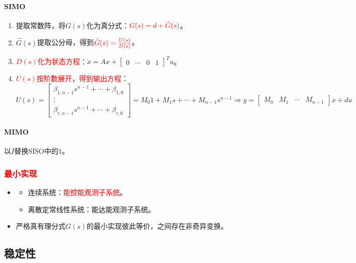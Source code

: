 \documentclass[
12pt, %
a4paper, 
oneside, %
]{scrartcl}
\begin{document}
\paragraph{SIMO}
\begin{enumerate}
\item 提取常数阵，将$ G(s) $化为真分式：$ \textcolor{red}{G(s) = d + \hat{G}(s)} $。
\item $ \hat{G}(s) $提取公分母，得到$ \textcolor{red}{\hat{G}(s) = \frac{U(s)}{D(s)}} $。
\item \textcolor{red}{$ D(s) $化为状态方程}：$ \dot{x} = A x + \begin{bmatrix} 0 & \cdots & 0 & 1 \end{bmatrix}^T u $。
\item \textcolor{red}{$ U(s) $按阶数展开，得到输出方程}：
$$ U(s) = \begin{bmatrix} \beta_{1, n - 1} s^{n - 1} + \cdots + \beta_{1, 0} \\ \vdots \\ \beta_{r, n - 1} s^{n - 1} + \cdots + \beta_{r, 0} \end{bmatrix} = M_0 1 + M_1 s + \cdots + M_{n - 1} s^{n - 1} \Rightarrow y = \begin{bmatrix} M_0 & M_1 & \cdots & M_{n - 1} \end{bmatrix} x + d u $$
\end{enumerate}
\paragraph{MIMO}
以$ I $替换SISO中的$ 1 $。
\subsubsection[最小实现]{\textcolor{red}{最小实现}}
\begin{itemize}
\item    
\begin{itemize}
\item 连续系统：\textcolor{red}{能控能观测子系统}。
\item 离散定常线性系统：能达能观测子系统。
\end{itemize}
\item 严格真有理分式$ G(s) $的最小实现彼此等价，之间存在非奇异变换。
\end{itemize}
\subsection[稳定性]{稳定性}
\end{document}
